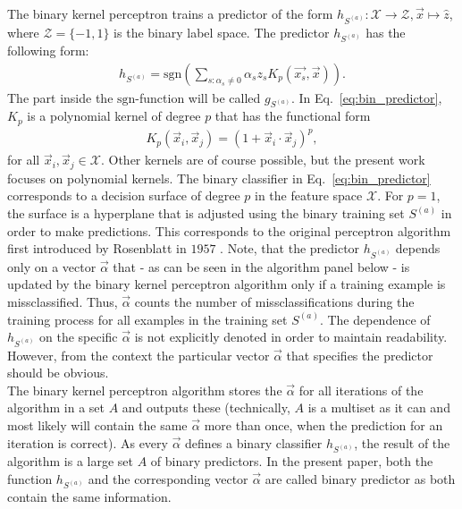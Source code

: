 The binary kernel perceptron trains a predictor of the form $h_{S^{(a)}}: \mathcal{X} \rightarrow \mathcal{Z}, \vec{x} \mapsto \hat{z}$, where $\mathcal{Z} = \{-1, 1\}$ is the binary label space. The predictor $h_{S^{(a)}}$ has the following form:
\begin{align}\label{eq:bin_predictor}
	h_{S^{(a)}} = \mathrm{sgn}\left( \sum_{s: \alpha_s \neq 0} \alpha_s z_s 	     	K_p(\vec{x_s}, \vec{x}) \right).
\end{align}
The part inside the $\mathrm{sgn}$-function will be called $g_{S^{(a)}}$. In Eq.~\ref{eq:bin_predictor}, $K_p$ is a polynomial kernel of degree $p$ that has the functional form
\begin{align*}
	K_p(\vec{x}_i, \vec{x}_j) = (1 + \vec{x}_i \cdot \vec{x}_j)^p,
\end{align*}
for all $\vec{x}_i, \vec{x}_j \in \mathcal{X}$. Other kernels are of course possible, but the present work focuses on polynomial kernels. The binary classifier in Eq.~\ref{eq:bin_predictor} corresponds to a decision surface of degree $p$ in the feature space $\mathcal{X}$. For $p=1$, the surface is a hyperplane that is adjusted using the binary training set $S^{(a)}$ in order to make predictions. This corresponds to the original perceptron algorithm first introduced by Rosenblatt in $1957$ \cite{perceptron1957}. Note, that the predictor $h_{S^{(a)}}$ depends only on a vector $\vec{\alpha}$ that - as can be seen in the algorithm panel below - is updated by the binary kernel perceptron algorithm only if a training example is missclassified. Thus, $\vec{\alpha}$ counts the number of missclassifications during the training process for all examples in the training set $S^{(a)}$. The dependence of $h_{S^{(a)}}$ on the specific $\vec{\alpha}$ is not explicitly denoted in order to maintain readability. However, from the context the particular vector $\vec{\alpha}$ that specifies the predictor should be obvious.\\ 

The binary kernel perceptron algorithm stores the $\vec{\alpha}$ for all iterations of the algorithm in a set $A$ and outputs these (technically, $A$ is a multiset as it can and most likely will contain the same $\vec{\alpha}$ more than once, when the prediction for an iteration is correct). As every $\vec{\alpha}$ defines a binary classifier $h_{S^{(a)}}$, the result of the algorithm is a large set $A$ of binary predictors. In the present paper, both the function $h_{S^{(a)}}$ and the corresponding vector $\vec{\alpha}$ are called binary predictor as both contain the same information.\\

